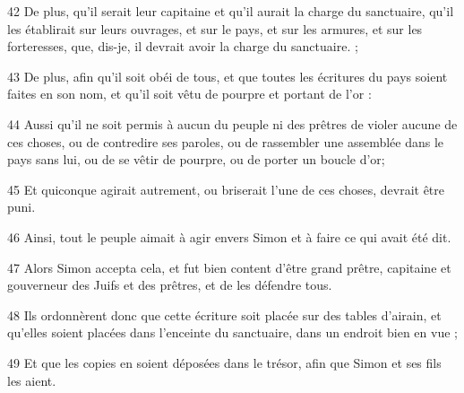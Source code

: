 \par 42 De plus, qu'il serait leur capitaine et qu'il aurait la charge du sanctuaire, qu'il les établirait sur leurs ouvrages, et sur le pays, et sur les armures, et sur les forteresses, que, dis-je, il devrait avoir la charge du sanctuaire. ;
\par 43 De plus, afin qu'il soit obéi de tous, et que toutes les écritures du pays soient faites en son nom, et qu'il soit vêtu de pourpre et portant de l'or :
\par 44 Aussi qu'il ne soit permis à aucun du peuple ni des prêtres de violer aucune de ces choses, ou de contredire ses paroles, ou de rassembler une assemblée dans le pays sans lui, ou de se vêtir de pourpre, ou de porter un boucle d'or;
\par 45 Et quiconque agirait autrement, ou briserait l'une de ces choses, devrait être puni.
\par 46 Ainsi, tout le peuple aimait à agir envers Simon et à faire ce qui avait été dit.
\par 47 Alors Simon accepta cela, et fut bien content d'être grand prêtre, capitaine et gouverneur des Juifs et des prêtres, et de les défendre tous.
\par 48 Ils ordonnèrent donc que cette écriture soit placée sur des tables d'airain, et qu'elles soient placées dans l'enceinte du sanctuaire, dans un endroit bien en vue ;
\par 49 Et que les copies en soient déposées dans le trésor, afin que Simon et ses fils les aient.


